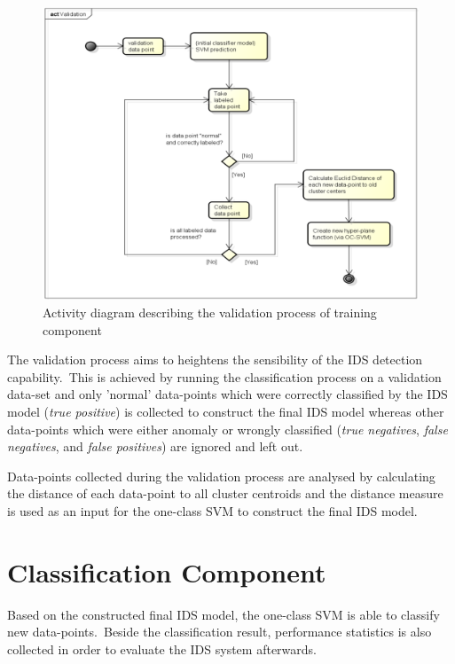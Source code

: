 		\begin{figure}[hb]
	 	 \centering
		  \includegraphics[scale=0.2668]{figures/ActivityDiagramValidation.png}
		  \caption{Activity diagram describing the validation process of training component}
		  \label{fig:activityDiagramValidation}
		\end{figure}
		
		The validation process aims to heightens the sensibility of the IDS detection capability.\ This is achieved by running the classification process on a validation data-set and only 'normal' data-points which were correctly classified by the IDS model (\textit{true positive}) is collected to construct the final IDS model whereas other data-points which were either anomaly or wrongly classified (\textit{true negatives}, \textit{false negatives}, and \textit{false positives}) are ignored and left out.
		
		Data-points collected during the validation process are analysed by calculating the distance of each data-point to all cluster centroids and the distance measure is used as an input for the one-class SVM to construct the final IDS model.

	\section{Classification Component}

		Based on the constructed final IDS model, the one-class SVM is able to classify new data-points.\ Beside the classification result, performance statistics is also collected in order to evaluate the IDS system afterwards.
		


